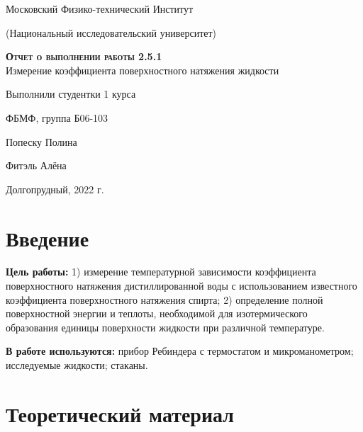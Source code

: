 \documentclass[12pt,a4paper]{article}
\begin{document}
\begin{titlepage}
  \begin{center}
    \huge
    Московский Физико-технический Институт
    
    (Национальный исследовательский университет)
    \vspace{0.5cm}

   
    \vspace{0.25cm}
 
    \vfill
 
    \vfill

    \textsc{\bf{Отчет о выполнении работы 2.5.1}}\\[3mm]
    
    {\LARGE  Измерение коэффициента поверхностного натяжения жидкости}
  \bigskip
    \vfill
    
\end{center}
\vfill
\begin{flushright}

    Выполнили студентки 1 курса
    
    ФБМФ, группа Б06-103

    Попеску Полина
    
    
    Фитэль Алёна

\end{flushright}
\bigskip


\vfill

\begin{center}
  Долгопрудный, 2022 г.
\end{center}
\end{titlepage}

\section{Введение}

\textbf{Цель работы:} 1) измерение температурной зависимости  коэффициента поверхностного натяжения дистиллированной воды с использованием известного коэффициента поверхностного натяжения спирта;  2) определение полной поверхностной энергии  и теплоты, необходимой для изотермического образования единицы  поверхности жидкости  при различной температуре. 


\textbf{В работе используются:} прибор  Ребиндера  с термостатом и микроманометром; исследуемые жидкости; стаканы.


\section{Теоретический материал}
\end{document}
